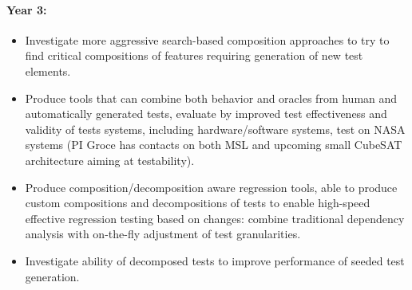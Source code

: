 \paragraph{Year 3:}
\begin{itemize}
\item
Investigate more aggressive search-based composition approaches to try
to find critical compositions of features requiring generation of new
test elements.
\item
Produce tools that can combine both behavior and oracles from human
and automatically generated tests, evaluate by improved test
effectiveness and validity of tests systems, including
hardware/software systems, test on NASA systems (PI Groce has contacts
on both MSL and upcoming small CubeSAT architecture aiming at
testability).
\item
Produce composition/decomposition aware regression tools, able to
produce custom compositions and decompositions of tests to enable
high-speed effective regression testing based on changes: combine
traditional dependency analysis with on-the-fly adjustment of test granularities.
\item Investigate ability of decomposed tests to improve performance
  of seeded test generation.
\end{itemize}


